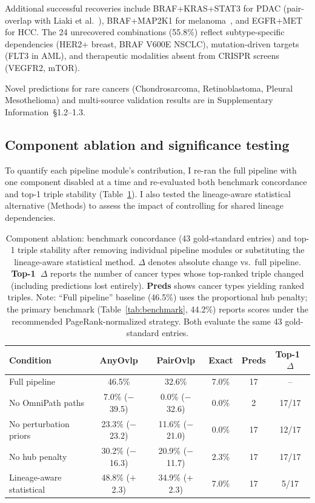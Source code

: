 \documentclass[times, twoside, watermark]{zHenriquesLab-StyleBioRxiv}
\begin{document}
Additional successful recoveries include BRAF+KRAS+STAT3 for PDAC (pair-overlap with Liaki et al.~\cite{Liaki2025}), BRAF+MAP2K1 for melanoma~\cite{Long2014}, and EGFR+MET for HCC. The 24 unrecovered combinations (55.8\%) reflect subtype-specific dependencies (HER2+ breast, BRAF V600E NSCLC), mutation-driven targets (FLT3 in AML), and therapeutic modalities absent from CRISPR screens (VEGFR2, mTOR).

Novel predictions for rare cancers (Chondrosarcoma, Retinoblastoma, Pleural Mesothelioma) and multi-source validation results are in Supplementary Information~\S1.2--1.3.

\subsection*{Component ablation and significance testing}
To quantify each pipeline module's contribution, I re-ran the full pipeline with one component disabled at a time and re-evaluated both benchmark concordance and top-1 triple stability (Table~\ref{tab:ablation}). I also tested the lineage-aware statistical alternative (Methods) to assess the impact of controlling for shared lineage dependencies.

\begin{table}[htbp]
\centering
\caption{Component ablation: benchmark concordance (43 gold-standard entries) and top-1 triple stability after removing individual pipeline modules or substituting the lineage-aware statistical method. $\Delta$ denotes absolute change vs.\ full pipeline. \textbf{Top-1~$\Delta$} reports the number of cancer types whose top-ranked triple changed (including predictions lost entirely). \textbf{Preds} shows cancer types yielding ranked triples. Note: ``Full pipeline'' baseline (46.5\%) uses the proportional hub penalty; the primary benchmark (Table~\ref{tab:benchmark}, 44.2\%) reports scores under the recommended PageRank-normalized strategy. Both evaluate the same 43 gold-standard entries.}
\label{tab:ablation}
\small
\begin{tabular}{@{}lccccc@{}}
\toprule
\textbf{Condition} & \textbf{AnyOvlp} & \textbf{PairOvlp} & \textbf{Exact} & \textbf{Preds} & \textbf{Top-1~$\Delta$} \\
\midrule
Full pipeline             & 46.5\% & 32.6\% & 7.0\% & 17 & -- \\
No OmniPath paths         & \phantom{0}7.0\% ($-$39.5) & \phantom{0}0.0\% ($-$32.6) & 0.0\% & \phantom{0}2 & 17/17 \\
No perturbation priors    & 23.3\% ($-$23.2) & 11.6\% ($-$21.0) & 0.0\% & 17 & 12/17 \\
No hub penalty            & 30.2\% ($-$16.3) & 20.9\% ($-$11.7) & 2.3\% & 17 & 17/17 \\
Lineage-aware statistical & 48.8\% ($+$2.3) & 34.9\% ($+$2.3) & 7.0\% & 17 & \phantom{0}5/17 \\
\bottomrule
\end{tabular}
\end{table}
\end{document}
